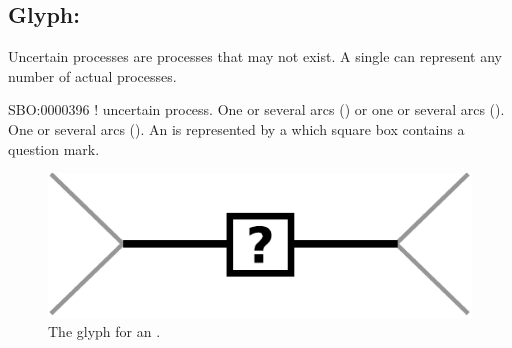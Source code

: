 \subsection{Glyph: }\label{sec:uncertain}

Uncertain processes are processes that may not exist. A single  can represent any number of actual processes.

\begin{glyphDescription}
 \glyphSboTerm SBO:0000396 ! uncertain process.
 \glyphOrigin One or several  arcs () or one or several  arcs ().
 \glyphTarget One or several  arcs ().
 \glyphNode An  is represented by a  which square box contains a question mark.
 \end{glyphDescription}

\begin{figure}[H]
  \centering
  \includegraphics[scale = 0.5]{images/uncertain}
  \caption{The \PD glyph for an .}
  \label{fig:uncertain}
\end{figure}

